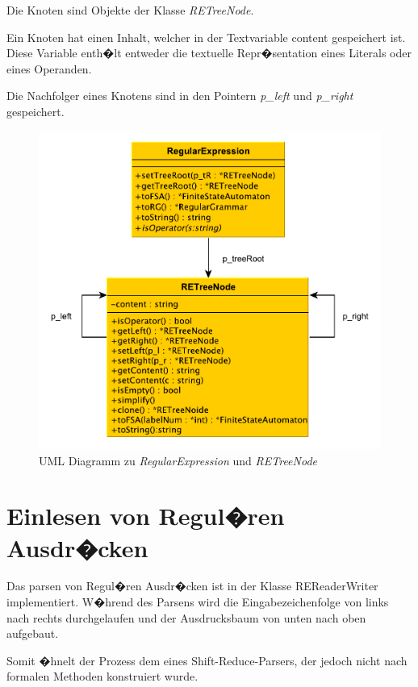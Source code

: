 Die Knoten sind Objekte der Klasse \textit{RETreeNode}.

Ein Knoten hat einen Inhalt, welcher in der Textvariable content gespeichert ist.
Diese Variable enth�lt entweder die textuelle Repr�sentation eines Literals oder eines
Operanden.

Die Nachfolger eines Knotens sind in den Pointern \textit{p\_left} und
\textit{p\_right} gespeichert.

\begin{figure}[h]
  \begin{center}
  \includegraphics{objectsToInclude/re_uml_ds.pdf}
  \caption{UML Diagramm zu \textit{RegularExpression} und \textit{RETreeNode}}
  \label{fig:UMLRegEx}
  \end{center}
\end{figure}

\section{Einlesen von Regul�ren Ausdr�cken}
Das parsen von Regul�ren Ausdr�cken ist in der Klasse REReaderWriter
implementiert. W�hrend des Parsens wird die Eingabezeichenfolge von links nach
rechts durchgelaufen und der Ausdrucksbaum von unten nach oben aufgebaut.

Somit �hnelt der Prozess dem eines Shift-Reduce-Parsers\cite{RegExShiftReduce}, der
jedoch nicht nach formalen Methoden konstruiert wurde.


